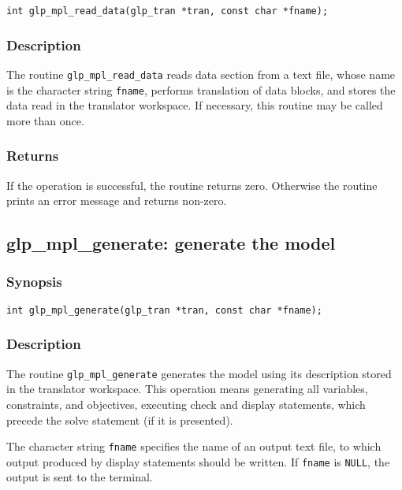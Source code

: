\begin{verbatim}
int glp_mpl_read_data(glp_tran *tran, const char *fname);
\end{verbatim}

\subsubsection*{Description}

The routine \verb|glp_mpl_read_data| reads data section from a text
file, whose name is the character string \verb|fname|, performs
translation of data blocks, and stores the data read in the translator
workspace. If necessary, this routine may be called more than once.

\subsubsection*{Returns}

If the operation is successful, the routine returns zero. Otherwise
the routine prints an error message and returns non-zero.

\subsection{glp\_mpl\_generate: generate the model}

\subsubsection*{Synopsis}

\begin{verbatim}
int glp_mpl_generate(glp_tran *tran, const char *fname);
\end{verbatim}

\subsubsection*{Description}

The routine \verb|glp_mpl_generate| generates the model using its
description stored in the translator workspace. This operation means
generating all variables, constraints, and objectives, executing check
and display statements, which precede the solve statement (if it is
presented).

The character string \verb|fname| specifies the name of an output text
file, to which output produced by display statements should be written.
If \verb|fname| is \verb|NULL|, the output is sent to the terminal.


